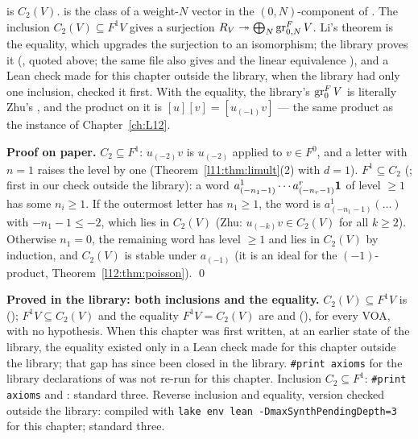 \begin{dictionary}
 is $C_2(V)$.  is the class of a weight-$N$ vector in the
$(0,N)$-component of . The inclusion $C_2(V)\subseteq F^1V$ gives
a surjection $R_V\twoheadrightarrow\bigoplus_N\operatorname{gr}^F_{0,N}V$. Li's theorem is the equality, which
upgrades the surjection to an isomorphism; the library proves it (, quoted above; the
same file also gives  and the linear equivalence
), and a Lean check made for this chapter outside the library, when the library had
only one inclusion, checked it first. With the equality, the
library's $\operatorname{gr}^F_0V$ is literally Zhu's , and the product on it is $[u][v] = [u_{(-1)}v]$ ---
the same product as the  instance of Chapter~\ref{ch:L12}.
\end{dictionary}

\textbf{Proof on paper.} $C_2\subseteq F^1$: $u_{(-2)}v$ is $u_{(-2)}$ applied to $v\in F^0$, and a letter
with $n=1$ raises the level by one (Theorem~\ref{l11:thm:limult}(2) with $d=1$). $F^1\subseteq C_2$ (; first in our
check outside the library): a word $a^1_{(-n_1-1)}\cdots a^r_{(-n_r-1)}\mathbf{1}$ of level $\ge1$ has some $n_i\ge1$. If
the outermost letter has $n_1\ge1$, the word is $a^1_{(-n_1-1)}(\dots)$ with $-n_1-1\le-2$, which lies in
$C_2(V)$ (Zhu: $u_{(-k)}v\in C_2(V)$ for all $k\ge2$). Otherwise $n_1 = 0$, the remaining word has level
$\ge1$ and lies in $C_2(V)$ by induction, and $C_2(V)$ is stable under $a_{(-1)}$ (it is an ideal for the
$(-1)$-product, Theorem~\ref{l12:thm:poisson}). \qed

\begin{status}
\textbf{Proved in the library: both inclusions and the equality.} $C_2(V)\subseteq F^1V$ is
 (); $F^1V\subseteq C_2(V)$ and the
equality $F^1V = C_2(V)$ are \allowbreak{}\allowbreak{}\allowbreak{}\allowbreak{} and \allowbreak{}\allowbreak{}\allowbreak{}\allowbreak{}
(), for every VOA, with no hypothesis. When this chapter was first written, at an earlier state of the library, the equality
existed only in a Lean check made for this chapter outside the library; that gap has
since been closed in the library. \texttt{\#print axioms} for the library declarations of  was not
re-run for this chapter. Inclusion $C_2\subseteq F^1$: \texttt{\#print axioms} \allowbreak{}\allowbreak{}\allowbreak{}\allowbreak{} and
\allowbreak{}\allowbreak{}\allowbreak{}\allowbreak{}\allowbreak{}\allowbreak{}: standard three. Reverse inclusion and equality, version
checked outside the library: compiled with \texttt{lake env lean -DmaxSynthPendingDepth=3} for this chapter; standard three.
\end{status}

